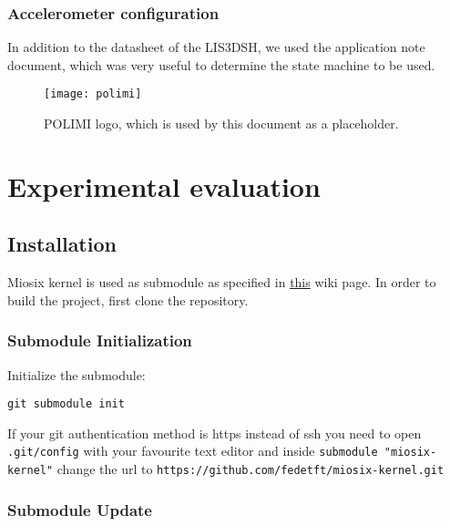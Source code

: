 \subsubsection{Accelerometer configuration}
In addition to the datasheet of the LIS3DSH, we used the application note
document, which was very useful to determine the state machine to be used.



\begin{figure}
\centering\texttt{[image: polimi]}
\caption{POLIMI logo, which is used by this document as a placeholder.}
\label{fig:polimi_logo}
\end{figure}


\section{Experimental evaluation}

\hypertarget{installation}{%
\subsection{Installation}\label{installation}}

Miosix kernel is used as submodule as specified in
\href{https://miosix.org/wiki/index.php?title=Miosix_and_git_workflow\#Setting_up_an_out_of_git_tree_project}{this}
wiki page.
In order to build the project, first clone the repository.

\hypertarget{submodule-initialization}{%
\subsubsection{Submodule
Initialization}\label{submodule-initialization}}

Initialize the submodule:

\begin{verbatim}
git submodule init
\end{verbatim}

If your git authentication method is https instead of ssh you need to
open \texttt{.git/config} with your favourite text editor and inside
\texttt{submodule\ "miosix-kernel"} change the url to
\texttt{https://github.com/fedetft/miosix-kernel.git}

\hypertarget{submodule-update}{%
\subsubsection{Submodule Update}\label{submodule-update}}

